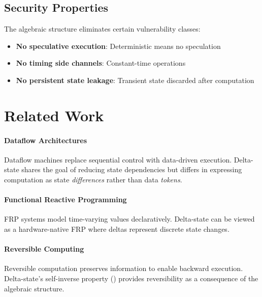 \documentclass[11pt,letterpaper]{article}
\theoremstyle{plain}
\theoremstyle{definition}
\theoremstyle{remark}
\begin{document}
\subsection{Security Properties}

The algebraic structure eliminates certain vulnerability classes:

\begin{itemize}
    \item \textbf{No speculative execution}: Deterministic means no speculation
    \item \textbf{No timing side channels}: Constant-time operations
    \item \textbf{No persistent state leakage}: Transient state discarded after computation
\end{itemize}

\section{Related Work}
\label{sec:related}

\paragraph{Dataflow Architectures}
Dataflow machines \cite{dennis1974first,arvind1990executing} replace sequential control with data-driven execution. Delta-state shares the goal of reducing state dependencies but differs in expressing computation as state \emph{differences} rather than data \emph{tokens}.

\paragraph{Functional Reactive Programming}
FRP systems \cite{elliott1997functional} model time-varying values declaratively. Delta-state can be viewed as a hardware-native FRP where deltas represent discrete state changes.

\paragraph{Reversible Computing}
Reversible computation \cite{landauer1961irreversibility,bennett1973logical} preserves information to enable backward execution. Delta-state's self-inverse property () provides reversibility as a consequence of the algebraic structure.
\end{document}
